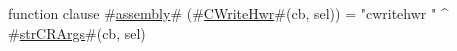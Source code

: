 function clause #\hyperref[sailMIPSzassembly]{assembly}# (#\hyperref[sailMIPSzCWriteHwr]{CWriteHwr}#(cb, sel)) = "cwritehwr " ^ #\hyperref[sailMIPSzstrCRArgs]{strCRArgs}#(cb, sel)
